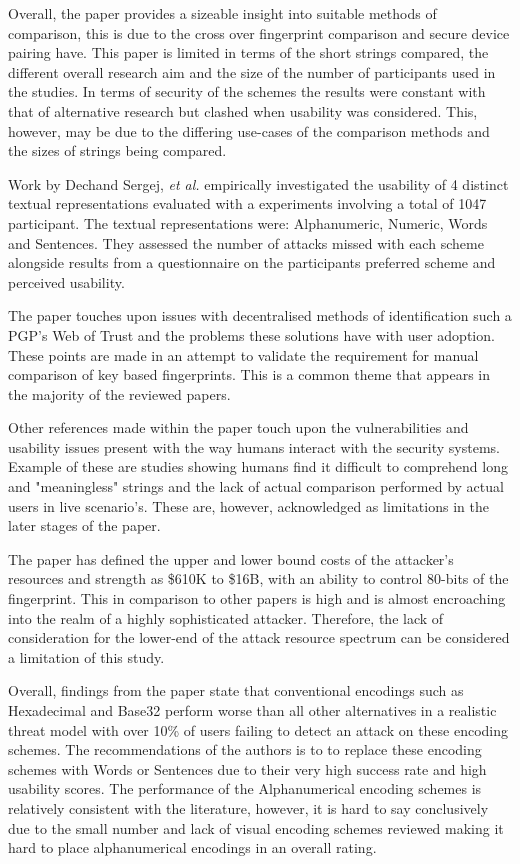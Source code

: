 Overall, the paper provides a sizeable insight into suitable methods of comparison, this is due to the cross over fingerprint comparison and secure device pairing have. This paper is limited in terms of the short strings compared, the different overall research aim and the size of the number of participants used in the studies. In terms of security of the schemes the results were constant with that of alternative research but clashed when usability was considered. This, however, may be due to the differing use-cases of the comparison methods and the sizes of strings being compared.

Work by Dechand Sergej, \textit{et al.}\cite{dechand2016empirical} empirically investigated the usability of 4 distinct textual representations evaluated with a experiments involving a total of 1047 participant. The textual representations were: Alphanumeric, Numeric, Words and Sentences. They assessed the number of attacks missed with each scheme alongside results from a questionnaire on the participants preferred scheme and perceived usability.

The paper touches upon issues with decentralised methods of identification such a PGP's Web of Trust and the problems these solutions have with user adoption. These points are made in an attempt to validate the requirement for manual comparison of key based fingerprints. This is a common theme that appears in the majority of the reviewed papers.

Other references made within the paper touch upon the vulnerabilities and usability issues present with the way humans interact with the security systems. Example of these are studies showing humans find it difficult to comprehend long and "meaningless" strings and the lack of actual comparison performed by actual users in live scenario's. These are, however, acknowledged as limitations in the later stages of the paper.

The paper has defined the upper and lower bound costs of the attacker's resources and strength as \$610K to \$16B, with an ability to control 80-bits of the fingerprint. This in comparison to other papers is high and is almost encroaching into the realm of a highly sophisticated attacker. Therefore, the lack of consideration for the lower-end of the attack resource spectrum can be considered a limitation of this study.

Overall, findings from the paper state that conventional encodings such as Hexadecimal and Base32 perform worse than all other alternatives in a realistic threat model with over 10\% of users failing to detect an attack on these encoding schemes. The recommendations of the authors is to to replace these encoding schemes with Words or Sentences due to their very high success rate and high usability scores. The performance of the Alphanumerical encoding schemes is relatively consistent with the literature, however, it is hard to say conclusively due to the small number and lack of visual encoding schemes reviewed making it hard to place alphanumerical encodings in an overall rating.

